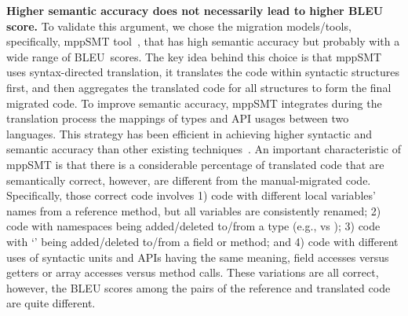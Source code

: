 {\bf Higher semantic accuracy does not necessarily lead to higher BLEU
  score.}
%
To validate this argument, we chose the migration models/tools,
specifically, mppSMT tool~\cite{ase15}, that has high semantic
accuracy but probably with a wide range of BLEU~scores.
The key idea behind this choice is that mppSMT uses syntax-directed
translation, \ie it translates the code within syntactic structures
first, and then aggregates the translated code for all structures to
form the final migrated code. To improve semantic accuracy, mppSMT
integrates during the translation process the mappings of types and
API usages between two languages. This strategy has been efficient in
achieving higher syntactic and semantic accuracy than other existing
techniques~\cite{ase15}. An important characteristic of mppSMT is that
there is a considerable percentage of translated code that are
semantically correct, however, are different from the manual-migrated
code. Specifically, those correct code involves 1) code with different
local variables' names from a reference method, but all variables are
consistently renamed; 2) code with namespaces being added/deleted
to/from a type (e.g.,  vs ); 3) code
with `' being added/deleted to/from a field or method; and
4) code with different uses of syntactic units and APIs having the
same meaning, \eg field accesses versus getters or array accesses
versus method calls. These variations are all correct, however, the
BLEU scores among the pairs of the reference and translated code are
quite different.




%

